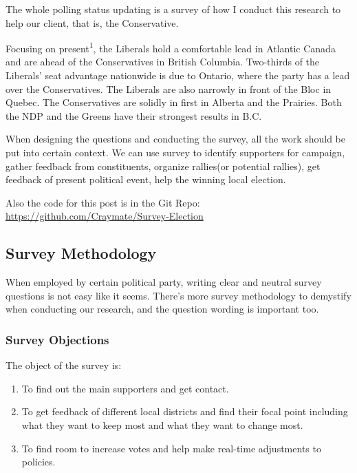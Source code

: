 \documentclass[
]{article}
\begin{document}
The whole polling status updating is a survey of how I conduct this
research to help our client, that is, the Conservative.

Focusing on present\textsuperscript{1}, the Liberals hold a comfortable
lead in Atlantic Canada and are ahead of the Conservatives in British
Columbia. Two-thirds of the Liberals' seat advantage nationwide is due
to Ontario, where the party has a lead over the Conservatives. The
Liberals are also narrowly in front of the Bloc in Quebec. The
Conservatives are solidly in first in Alberta and the Prairies. Both the
NDP and the Greens have their strongest results in B.C.

When designing the questions and conducting the survey, all the work
should be put into certain context. We can use survey to identify
supporters for campaign, gather feedback from constituents, organize
rallies(or potential rallies), get feedback of present political event,
help the winning local election.

Also the code for this post is in the Git Repo:
\url{https://github.com/Craymate/Survey-Election}

\hypertarget{survey-methodology}{%
\subsection{Survey Methodology}\label{survey-methodology}}

When employed by certain political party, writing clear and neutral
survey questions is not easy like it seems. There's more survey
methodology to demystify when conducting our research, and the question
wording is important too.

\hypertarget{survey-objections}{%
\subsubsection{Survey Objections}\label{survey-objections}}

The object of the survey is:

\begin{enumerate}
\def\labelenumi{\arabic{enumi}.}
\item
  To find out the main supporters and get contact.
\item
  To get feedback of different local districts and find their focal
  point including what they want to keep most and what they want to
  change most.
\item
  To find room to increase votes and help make real-time adjustments to
  policies.
\end{enumerate}
\end{document}
